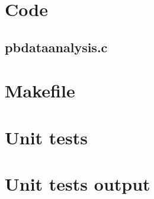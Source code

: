 \begin{scriptsize}
\begin{ttfamily}

\end{ttfamily}
\end{scriptsize}

\section{Code}

\subsection{pbdataanalysis.c}

\begin{scriptsize}
\begin{ttfamily}

\end{ttfamily}
\end{scriptsize}

\section{Makefile}

\begin{scriptsize}
\begin{ttfamily}

\end{ttfamily}
\end{scriptsize}

\section{Unit tests}

\begin{scriptsize}
\begin{ttfamily}

\end{ttfamily}
\end{scriptsize}

\section{Unit tests output}

\begin{scriptsize}
\begin{ttfamily}

\end{ttfamily}
\end{scriptsize}

